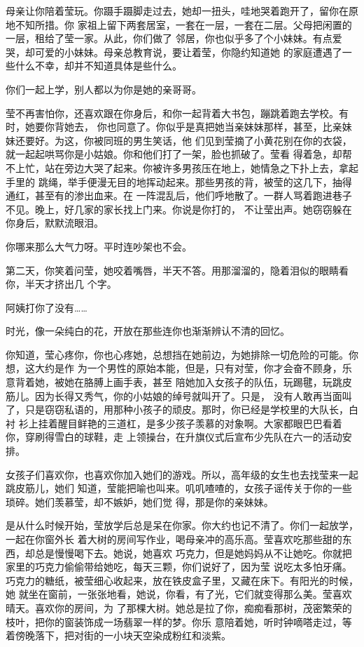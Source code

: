 		母亲让你陪着莹玩。你蹑手蹑脚走过去，她却一扭头，哇地哭着跑开了，留你在原地不知所措。你
	家祖上留下两套居室，一套在一层，一套在二层。父母把闲置的一层，租给了莹一家。从此，你们做了
	邻居，你也似乎多了个小妹妹。有点爱哭，却可爱的小妹妹。母亲总教育说，要让着莹，你隐约知道她
	的家庭遭遇了一些什么不幸，却并不知道具体是些什么。


		你们一起上学，别人都以为你是她的亲哥哥。

		莹不再害怕你，还喜欢跟在你身后，和你一起背着大书包，蹦跳着跑去学校。有时，她要你背她去，
	你也同意了。你似乎是真把她当亲妹妹那样，甚至，比亲妹妹还要好。为这，你被同班的男生笑话，他
	们见到莹摘了小黄花别在你的衣袋，就一起起哄骂你是小姑娘。你和他们打了一架，脸也抓破了。莹看
	得着急，却帮不上忙，站在旁边大哭了起来。你被许多男孩压在地上，她情急之下扑上去，拿起手里的
	跳绳，举手便漫无目的地挥动起来。那些男孩的背，被莹的这几下，抽得通红，甚至有的渗出血来。在
	一阵混乱后，他们呼地散了。一群人骂着跑进巷子不见。晚上，好几家的家长找上门来。你说是你打的，
	不让莹出声。她窃窃躲在你身后，默默流眼泪。


		你哪来那么大气力呀。平时连吵架也不会。

		第二天，你笑着问莹，她咬着嘴唇，半天不答。用那溜溜的，隐着泪似的眼睛看你，半天才挤出几
	个字。

		阿姨打你了没有……


		时光，像一朵纯白的花，开放在那些连你也渐渐辨认不清的回忆。

		你知道，莹心疼你，你也心疼她，总想挡在她前边，为她排除一切危险的可能。你想，这大约是作
	为一个男性的原始本能，但是，只有对莹，你才会奋不顾身，乐意背着她，被她在胳膊上画手表，甚至
	陪她加入女孩子的队伍，玩踢毽，玩跳皮筋儿。因为长得又秀气，你的小姑娘的绰号就叫开了。只是，
	没有人敢再当面叫了，只是窃窃私语的，用那种小孩子的顽皮。那时，你已经是学校里的大队长，白衬
	衫上挂着醒目鲜艳的三道杠，是多少孩子羡慕的对象啊。大家都眼巴巴看着你，穿刷得雪白的球鞋，走
	上领操台，在升旗仪式后宣布少先队在六一的活动安排。

		女孩子们喜欢你，也喜欢你加入她们的游戏。所以，高年级的女生也去找莹来一起跳皮筋儿，她们
	知道，莹能把喻也叫来。叽叽喳喳的，女孩子谣传关于你的一些琐碎。她们羡慕莹，却不嫉妒，她们觉
	得，那是你的亲妹妹。


		是从什么时候开始，莹放学后总是呆在你家。你大约也记不清了。你们一起放学，一起在你窗外长
	着大树的房间写作业，喝母亲冲的高乐高。莹喜欢吃那些甜的东西，却总是慢慢喝下去。她说，她喜欢
	巧克力，但是她妈妈从不让她吃。你就把家里的巧克力偷偷带给她吃，每天三颗，你们说好了，因为莹
	说吃太多怕牙痛。巧克力的糖纸，被莹细心收起来，放在铁皮盒子里，又藏在床下。有阳光的时候，她
	就坐在窗前，一张张地看，她说，你看，有了光，它们就变得那么美。莹喜欢晴天。喜欢你的房间，为
	了那棵大树。她总是拉了你，痴痴看那树，茂密繁荣的枝叶，把你的窗装饰成一场翡翠一样的梦。你乐
	意陪着她，听时钟嘀嗒走过，等着傍晚落下，把对街的一小块天空染成粉红和淡紫。


